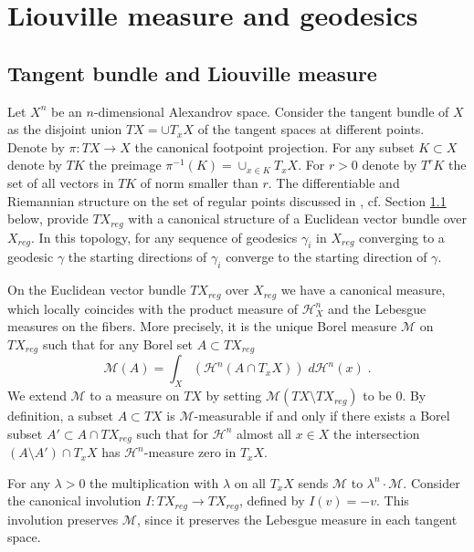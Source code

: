 \documentclass[12pt,leqno]{amsart}
\numberwithin{equation}{section}
\theoremstyle{definition}
\theoremstyle{remark}
\def\:{\colon}
\begin{document}
\section{Liouville measure and geodesics}
\subsection{Tangent bundle and Liouville measure}
Let $X^n$ be an $n$-dimensional Alexandrov space. Consider the tangent bundle of $X$
  as the  disjoint union $TX=\cup T_x X$ of the tangent spaces at different points. Denote by $\pi\:TX\to X$ the canonical footpoint projection.
	For any subset $K\subset X$ denote by $TK$ the preimage $\pi^{-1} (K)= \cup _{x\in K} T_xX$. For $r>0$ denote by $T^r K$ the set of all vectors in $TK$
	of norm smaller than $r$.
 The   differentiable and Riemannian structure on the set of regular points discussed in \cite{Otsu}, cf. Section \ref{} below,  provide  $TX_{reg}$ with a canonical structure of a Euclidean vector bundle over $X_{reg}$. In this topology, for any sequence of geodesics $\gamma _i$ in $X_{reg}$ converging to a geodesic $\gamma$ the starting directions of $\gamma _i$ converge to the starting direction of $\gamma$.

 On the Euclidean vector bundle $TX_{reg}$ over $X_{reg}$ we have a canonical measure, which locally coincides with the product measure of $\mathcal H^n _X$ and the Lebesgue measures on the fibers. More precisely,
 it is the unique Borel measure $\mathcal M$ on $TX_{reg}$ such that for any  Borel set $A\subset TX_{reg}$
 $$\mathcal M(A)= \int _X (\mathcal H^n(A \cap T_x X)) \; d\mathcal H^n (x) \; .$$
 We extend $\mathcal M$ to a measure on $TX$ by setting $\mathcal M(TX\setminus TX_{reg})$ to be $0$.
By definition, a subset $A\subset TX$ is $\mathcal M$-measurable if and only if there exists  a Borel subset $A'\subset A\cap TX_{reg}$ such that
for $\mathcal H^n$ almost all $x\in X$ the intersection $(A\setminus A') \cap T_xX$ has $\mathcal H^n$-measure zero in $T_xX$.




 For any $\lambda >0$ the multiplication with $\lambda$  on all $T_xX$ sends $\mathcal M $ to $\lambda ^n \cdot \mathcal M$.
 Consider the canonical involution $I\:TX_{reg}\to TX_{reg}$, defined by $I(v)=-v$.
This involution preserves $\mathcal M$, since it preserves the Lebesgue measure in each tangent space.
\end{document}
